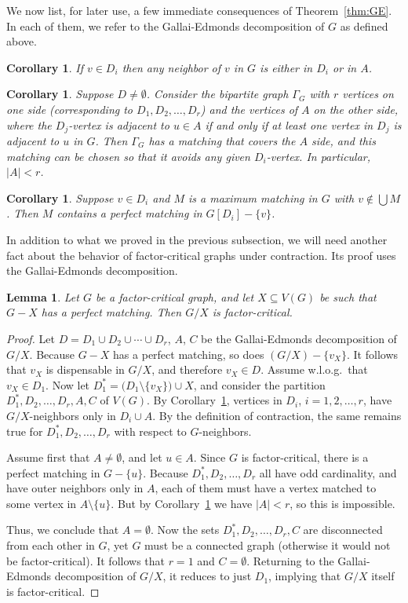 \documentclass{article}
\newtheorem{lemma}[theorem]{Lemma}
\newtheorem{corollary}[theorem]{Corollary}
\theoremstyle{definition}
\begin{document}
We now list, for later use, a few immediate consequences of Theorem~\ref{thm:GE}. In each of them, we refer to the Gallai-Edmonds decomposition of $G$ as defined above.
\begin{corollary} \label{cor:NBR}
If $v \in D_i$ then any neighbor of $v$ in $G$ is either in $D_i$ or in $A$.
\end{corollary}
\begin{corollary} \label{cor:BP}
Suppose $D \ne \emptyset$. Consider the bipartite graph $\Gamma_G$ with $r$ vertices on one side (corresponding to $D_1, D_2, \ldots , D_r$) and the vertices of $A$ on the other side, where the $D_j$-vertex is adjacent to $u \in A$ if and only if at least one vertex in $D_j$ is adjacent to $u$ in $G$. Then $\Gamma_G$ has a matching that covers the $A$ side, and this matching can be chosen so that it avoids any given $D_i$-vertex. In particular, $|A| < r$.
\end{corollary}
\begin{corollary} \label{cor:MM}
Suppose $v \in D_i$ and $M$ is a maximum matching in $G$ with $v \notin \bigcup M$. Then $M$ contains a perfect matching in $G[D_i] - \{v\}$.
\end{corollary}

In addition to what we proved in the previous subsection, we will need another fact about the behavior of factor-critical graphs under contraction. Its proof uses the Gallai-Edmonds decomposition.
\begin{lemma} \label{lem:PM}
Let $G$ be a factor-critical graph, and let $X \subseteq V(G)$ be such that $G - X$ has a perfect matching. Then $G/X$ is factor-critical.
\end{lemma}
\begin{proof} Let $D = D_1 \cup D_2 \cup \cdots \cup D_r$, $A$, $C$ be the Gallai-Edmonds decomposition of $G/X$. Because $G - X$ has a perfect matching, so does $(G/X) - \{v_X\}$. It follows that $v_X$ is dispensable in $G/X$, and therefore $v_X \in D$. Assume w.l.o.g.\ that $v_X \in D_1$. Now let $D^*_1 = \bigl( D_1 \setminus \{v_X\}\bigr) \cup X$, and consider the partition $D^*_1, D_2, \ldots , D_r, A, C$ of $V(G)$. By Corollary~\ref{cor:NBR}, vertices in $D_i$, $i=1,2, \ldots , r$, have $G/X$-neighbors only in $D_i \cup A$. By the definition of contraction, the same remains true for $D^*_1, D_2, \ldots , D_r$ with respect to $G$-neighbors.

Assume first that $A \ne \emptyset$, and let $u \in A$. Since $G$ is factor-critical, there is a perfect matching in $G - \{u\}$. Because $D^*_1, D_2, \ldots , D_r$ all have odd cardinality, and have outer neighbors only in $A$, each of them must have a vertex matched to some vertex in $A \setminus \{u\}$. But by Corollary~\ref{cor:BP} we have $|A| < r$, so this is impossible.

Thus, we conclude that $A = \emptyset$. Now the sets $D^*_1, D_2, \ldots , D_r, C$ are disconnected from each other in $G$, yet $G$ must be a connected graph (otherwise it would not be factor-critical). It follows that $r=1$ and $C = \emptyset$. Returning to the Gallai-Edmonds decomposition of $G/X$, it reduces to just $D_1$, implying that $G/X$ itself is factor-critical.
\end{proof}
\end{document}
